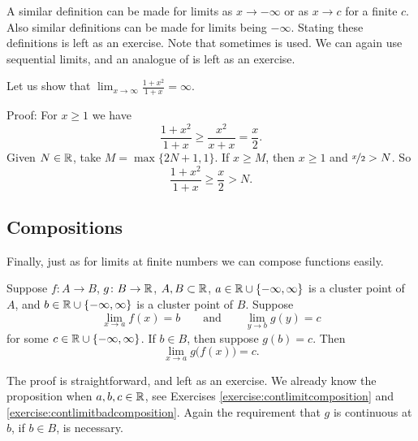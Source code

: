 A similar definition can be made for limits as $x \to -\infty$
or as $x \to c$ for a finite $c$.  Also similar definitions can be
made for limits being $-\infty$.  Stating these definitions is left
as an exercise.
Note that
sometimes \emph{} is used.
We can again use sequential limits, and an analogue of 
 is left as an exercise.

\begin{example}
Let us show that $\lim_{x \to \infty} \frac{1+x^2}{1+x} = \infty$.

Proof: For $x \geq 1$ we have
\begin{equation*}
\frac{1+x^2}{1+x} \geq 
\frac{x^2}{x+x}  = 
\frac{x}{2} .
\end{equation*}
Given $N \in {\mathbb{R}}$, take $M = \max \{ 2N+1 , 1 \}$.
If $x \geq M$, then $x \geq 1$ and $\nicefrac{x}{2} > N$.
So
\begin{equation*}
\frac{1+x^2}{1+x} \geq 
\frac{x}{2} > N .
\end{equation*}
\end{example}

\subsection{Compositions}

Finally, just as for limits at finite numbers we can compose functions
easily.

\begin{prop} \label{prop:inflimcompositions}
Suppose $f \colon A \to B$, $g \colon B \to {\mathbb{R}}$, $A, B \subset {\mathbb{R}}$, 
$a \in {\mathbb{R}} \cup \{ -\infty, \infty\}$ is a cluster point of $A$,
and $b \in {\mathbb{R}} \cup \{ -\infty, \infty\}$ is a cluster point of $B$.
Suppose 
\begin{equation*}
\lim_{x \to a} f(x) = b\qquad \text{and} \qquad \lim_{y \to b} g(y) = c
\end{equation*}
for some $c \in {\mathbb{R}} \cup \{ -\infty, \infty \}$.
If $b \in B$, then suppose $g(b) = c$.
Then
\begin{equation*}
\lim_{x \to a} g\bigl(f(x)\bigr) = c .
\end{equation*}
\end{prop}

The proof is straightforward, and left as an exercise.  We already
know the proposition when $a, b, c \in {\mathbb{R}}$, see Exercises
\ref{exercise:contlimitcomposition} and
\ref{exercise:contlimitbadcomposition}.  Again the requirement that $g$ is
continuous at $b$, if $b \in B$, is necessary.

